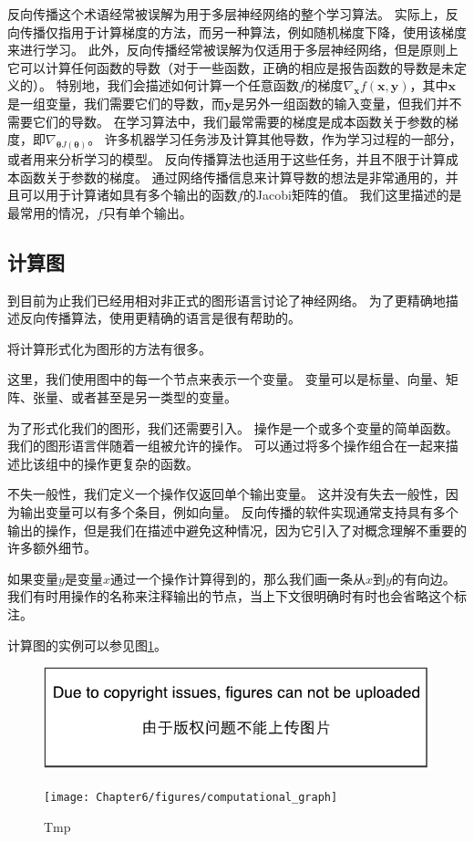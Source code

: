 反向传播这个术语经常被误解为用于多层神经网络的整个学习算法。
实际上，反向传播仅指用于计算梯度的方法，而另一种算法，例如随机梯度下降，使用该梯度来进行学习。
此外，反向传播经常被误解为仅适用于多层神经网络，但是原则上它可以计算任何函数的导数（对于一些函数，正确的相应是报告函数的导数是未定义的）。
特别地，我们会描述如何计算一个任意函数$f$的梯度$\nabla_{\bm{x}} f(\bm{x}, \bm{y})$，其中$\bm{x}$是一组变量，我们需要它们的导数，而$\bm{y}$是另外一组函数的输入变量，但我们并不需要它们的导数。
在学习算法中，我们最常需要的梯度是成本函数关于参数的梯度，即$\nabla_{\bm{\theta}J(\bm{\theta})}$。
许多机器学习任务涉及计算其他导数，作为学习过程的一部分，或者用来分析学习的模型。
反向传播算法也适用于这些任务，并且不限于计算成本函数关于参数的梯度。
通过网络传播信息来计算导数的想法是非常通用的，并且可以用于计算诸如具有多个输出的函数$f$的Jacobi矩阵的值。
我们这里描述的是最常用的情况，$f$只有单个输出。

\subsection{计算图}
\label{sec:computational_graphs}

到目前为止我们已经用相对非正式的图形语言讨论了神经网络。
为了更精确地描述反向传播算法，使用更精确的语言是很有帮助的。

将计算形式化为图形的方法有很多。

这里，我们使用图中的每一个节点来表示一个变量。
变量可以是标量、向量、矩阵、张量、或者甚至是另一类型的变量。

为了形式化我们的图形，我们还需要引入。
操作是一个或多个变量的简单函数。
我们的图形语言伴随着一组被允许的操作。
可以通过将多个操作组合在一起来描述比该组中的操作更复杂的函数。


不失一般性，我们定义一个操作仅返回单个输出变量。
这并没有失去一般性，因为输出变量可以有多个条目，例如向量。
反向传播的软件实现通常支持具有多个输出的操作，但是我们在描述中避免这种情况，因为它引入了对概念理解不重要的许多额外细节。

如果变量$y$是变量$x$通过一个操作计算得到的，那么我们画一条从$x$到$y$的有向边。
我们有时用操作的名称来注释输出的节点，当上下文很明确时有时也会省略这个标注。

计算图的实例可以参见图\ref{fig:chap6_computational_graph}。
\begin{figure}[!htb]
\ifOpenSource
\centerline{\includegraphics{figure.pdf}}
\else
\centerline{\texttt{[image: Chapter6/figures/computational\_graph]}}
\fi
\caption{Tmp}
\label{fig:chap6_computational_graph}
\end{figure}


